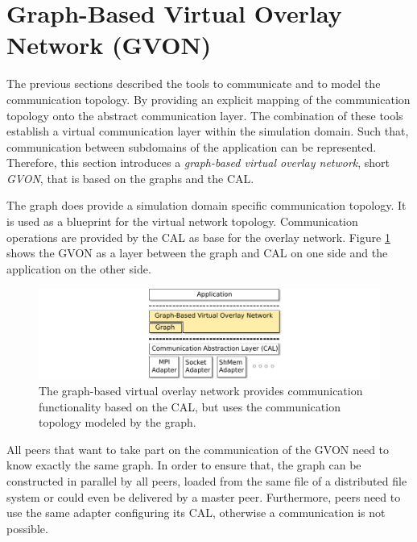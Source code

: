 \section{Graph-Based Virtual Overlay Network (GVON)}
\label{sec:gvon}
The previous sections described the tools to communicate and to model
the communication topology. By providing an explicit mapping of the
communication topology onto the abstract communication layer. The
combination of these tools establish a virtual communication layer
within the simulation domain.  Such that, communication between
subdomains of the application can be represented. Therefore, this
section introduces a \textit{graph-based virtual overlay network},
short \textit{GVON}, that is based on the graphs and the CAL.

The graph does provide a simulation domain specific communication
topology.  It is used as a blueprint for the virtual network topology.
Communication operations are provided by the CAL as base for the
overlay network.  Figure \ref{fig:gvon} shows the GVON as a layer
between the graph and CAL on one side and the application on the other
side.

\begin{figure}[H]
  \centering \includegraphics[width=\textwidth]{graphics/30_gvon}
  \caption{The graph-based virtual overlay network provides
    communication functionality based on the CAL, but uses the
    communication topology modeled by the graph.}
  \label{fig:gvon}
\end{figure}

All peers that want to take part on the communication of the GVON need
to know exactly the same graph. In order to ensure that, the graph can be
constructed in parallel by all peers, loaded from the same file of a
distributed file system or could even be delivered by a master
peer. Furthermore, peers need to use the same adapter configuring its
CAL, otherwise a communication is not possible.


